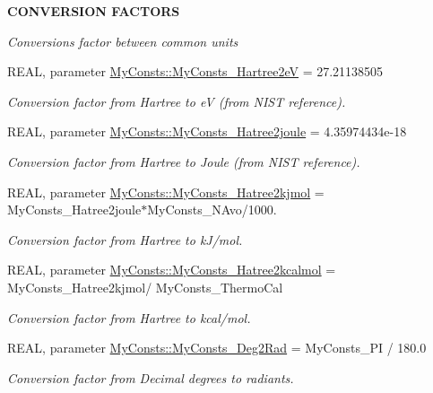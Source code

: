 \begin{Indent}{\bf CONVERSION FACTORS}\par
{\em \label{_amgrp967a702e6e71caee351fcca5d9a7e303}
Conversions factor between common units }\begin{DoxyCompactItemize}
\item 
REAL, parameter \hyperlink{namespace_my_consts_aa924b16cd5b1a897d1d3983c45adca62}{MyConsts::MyConsts\_\-Hartree2eV} = 27.21138505
\begin{DoxyCompactList}\small\item\em Conversion factor from Hartree to eV (from NIST reference). \item\end{DoxyCompactList}\item 
REAL, parameter \hyperlink{namespace_my_consts_aaa4538847321d2d0c658c076868a98e6}{MyConsts::MyConsts\_\-Hatree2joule} = 4.35974434e-\/18
\begin{DoxyCompactList}\small\item\em Conversion factor from Hartree to Joule (from NIST reference). \item\end{DoxyCompactList}\item 
REAL, parameter \hyperlink{namespace_my_consts_a52c584174f4239e0fc306f998e2ea995}{MyConsts::MyConsts\_\-Hatree2kjmol} = MyConsts\_\-Hatree2joule$\ast$MyConsts\_\-NAvo/1000.
\begin{DoxyCompactList}\small\item\em Conversion factor from Hartree to kJ/mol. \item\end{DoxyCompactList}\item 
REAL, parameter \hyperlink{namespace_my_consts_a10bc4f3baa41b52bdf26dc261a49bcf7}{MyConsts::MyConsts\_\-Hatree2kcalmol} = MyConsts\_\-Hatree2kjmol/ MyConsts\_\-ThermoCal
\begin{DoxyCompactList}\small\item\em Conversion factor from Hartree to kcal/mol. \item\end{DoxyCompactList}\item 
REAL, parameter \hyperlink{namespace_my_consts_ac63452d39765e7e679949322436dfb08}{MyConsts::MyConsts\_\-Deg2Rad} = MyConsts\_\-PI / 180.0
\begin{DoxyCompactList}\small\item\em Conversion factor from Decimal degrees to radiants. \item\end{DoxyCompactList}\item 

\end{DoxyCompactItemize}
\end{Indent}
